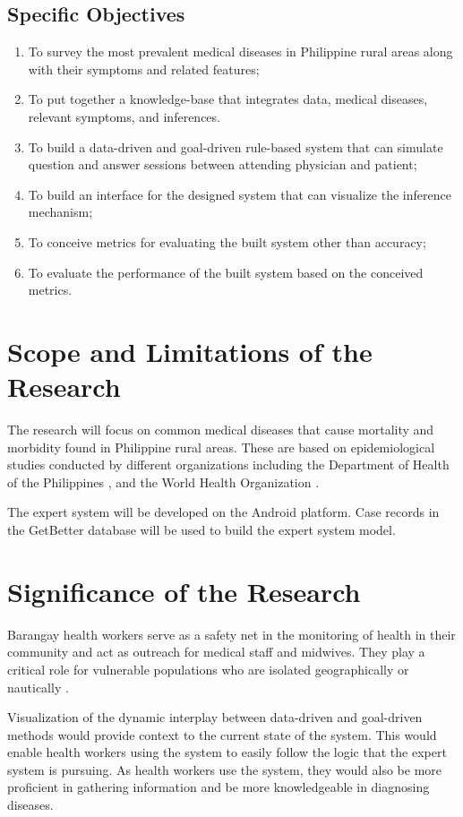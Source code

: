 \subsection{Specific Objectives}
\label{sec:specificobjectives}

\begin{enumerate}
    \item To survey the most prevalent medical diseases in Philippine rural areas along with their symptoms and related features;
    \item To put together a knowledge-base that integrates data, medical diseases, relevant symptoms, and inferences.
    \item To build a data-driven and goal-driven rule-based system that can simulate question and answer sessions between attending physician and patient;
    \item To build an interface for the designed system that can visualize the inference mechanism; %
    \item To conceive metrics for evaluating the built system other than accuracy;
    \item To evaluate the performance of the built system based on the conceived metrics.
\end{enumerate}

\section{Scope and Limitations of the Research}
\label{sec:scopelimitations}

The research will focus on common medical diseases that cause mortality and morbidity found in Philippine rural areas.
These are based on epidemiological studies conducted by different organizations including 
the Department of Health of the Philippines \cite{doh:2016},
and the World Health Organization \cite{who:2016}.

The expert system will be developed on the Android platform. 
Case records in the GetBetter database will be used to build the expert system model. 

\section{Significance of the Research}
\label{sec:significance}

Barangay health workers serve as a safety net in the monitoring of health in their community and act as outreach for medical staff and midwives.
They play a critical role for vulnerable populations who are isolated geographically or nautically \cite{DirectRelief:2014}.

Visualization of the dynamic interplay between data-driven and goal-driven methods would provide context to the current state of the system.
This would enable health workers using the system to easily follow the logic that the expert system is pursuing. 
As health workers use the system, they would also be more proficient in gathering information and be more knowledgeable in diagnosing diseases.

